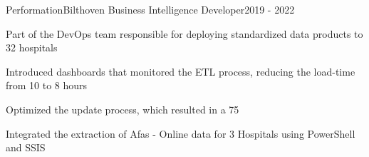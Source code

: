 \resumeSubheading
  {Performation}{Bilthoven}
  {Business Intelligence Developer}{2019 - 2022}
  \vspace{\experienceItemSpacing}
  \resumeItemListStart
\item Part of the DevOps team responsible for deploying standardized data products to 32 hospitals
\item Introduced dashboards that monitored the ETL process, reducing the load-time from 10 to 8 hours
\item Optimized the update process, which resulted in a 75%
\item Integrated the extraction of Afas - Online data for 3 Hospitals using PowerShell and SSIS
  \resumeItemListEnd